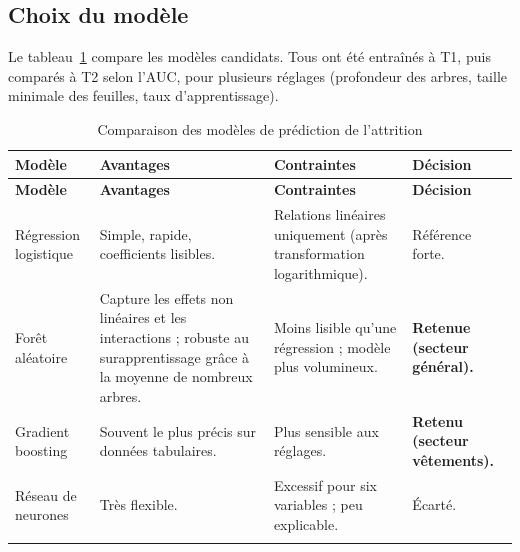\subsection{Choix du modèle}
Le tableau~\ref{tab:comparaison-churn} compare les modèles candidats. Tous ont été entraînés à T1, puis comparés à T2 selon l'AUC, pour plusieurs réglages (profondeur des arbres, taille minimale des feuilles, taux d'apprentissage).
\renewcommand{\arraystretch}{1.4}
\begin{longtable}{|p{3.1cm}|p{4.3cm}|p{4.3cm}|p{2.5cm}|}
\hline
\textbf{Modèle} & \textbf{Avantages} & \textbf{Contraintes} & \textbf{Décision} \\
\hline
\endfirsthead
\hline
\textbf{Modèle} & \textbf{Avantages} & \textbf{Contraintes} & \textbf{Décision} \\
\hline
\endhead
Régression logistique & Simple, rapide, coefficients lisibles. & Relations linéaires uniquement (après transformation logarithmique). & Référence forte. \\
\hline
Forêt aléatoire & Capture les effets non linéaires et les interactions ; robuste au surapprentissage grâce à la moyenne de nombreux arbres. & Moins lisible qu'une régression ; modèle plus volumineux. & \textbf{Retenue (secteur général).} \\
\hline
Gradient boosting & Souvent le plus précis sur données tabulaires. & Plus sensible aux réglages. & \textbf{Retenu (secteur vêtements).} \\
\hline
Réseau de neurones & Très flexible. & Excessif pour six variables ; peu explicable. & Écarté. \\
\hline
\caption{Comparaison des modèles de prédiction de l'attrition}
\label{tab:comparaison-churn}
\end{longtable}

